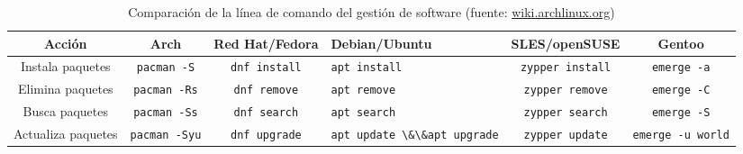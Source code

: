 \documentclass[
	spanish,
	9pt,
	xcolor=table,
	handout,
	aspectratio=1610,
  ignorenonframetext
]{beamer}
\begin{document}
\begin{frame}
  \begin{table}[ht!]
    \caption{Comparación de la línea de comando del gestión de software (fuente: \url{wiki.archlinux.org})}
    \centering\footnotesize
    \begin{tabular}{cccp{50pt}cc}
      \toprule
      Acción             & Arch                    & Red Hat/Fedora          & Debian/Ubuntu                                          & SLES/openSUSE           & Gentoo
      \tabularnewline
      \midrule
      Instala paquetes   & \lstinline|pacman -S|  & \lstinline|dnf install|  & \lstinline|apt install|                                 & \lstinline|zypper install|  & \lstinline|emerge -a|
      \tabularnewline
      Elimina paquetes   & \lstinline|pacman -Rs|  & \lstinline|dnf remove|  & \lstinline|apt remove|                                 & \lstinline|zypper remove|  & \lstinline|emerge -C|
      \tabularnewline
      Busca paquetes     & \lstinline|pacman -Ss| & \lstinline|dnf search| & \lstinline|apt search|                                & \lstinline|zypper search| & \lstinline|emerge -S|
      \tabularnewline
      Actualiza paquetes & \lstinline|pacman -Syu| & \lstinline|dnf upgrade| & \lstinline|apt update \&\&|\newline\lstinline|apt upgrade| & \lstinline|zypper update| & \lstinline|emerge -u world|
      \tabularnewline
      \bottomrule
    \end{tabular}
  \end{table}

\end{frame}
\end{document}
